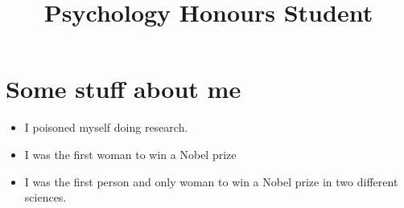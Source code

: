 \documentclass[11pt,a4paper,]{moderncv}
\title{Psychology Honours Student} %
\providecommand{\tightlist}{%
	\setlength{\itemsep}{0pt}\setlength{\parskip}{0pt}}
\begin{document}
\makecvtitle %



\section{Some stuff about me}\label{some-stuff-about-me}

\begin{itemize}
\tightlist
\item
  I poisoned myself doing research.
\item
  I was the first woman to win a Nobel prize
\item
  I was the first person and only woman to win a Nobel prize in two
  different sciences.
\end{itemize}
\end{document}
